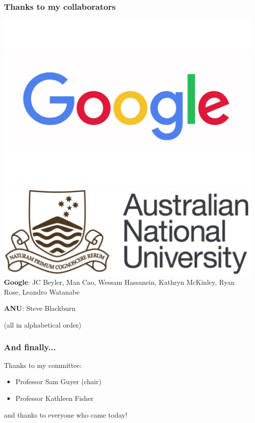 \documentclass[11pt]{beamer}
\begin{document}
\begin{frame}
  \frametitle{Thanks to my collaborators}
  \includegraphics[scale=0.1]{google.jpg}
  \hspace*{\fill}
  \includegraphics[scale=0.1]{anu.jpeg}
  \textbf{Google}: JC Beyler, Man Cao, Wessam Hassanein, Kathryn McKinley, Ryan Rose,
  Leandro Watanabe
  
  \textbf{ANU}: Steve Blackburn

  (all in alphabetical order)
\end{frame}

\begin{frame}
  \frametitle{And finally...}
  Thanks to my committee:
  \begin{itemize}
  \item Professor Sam Guyer (chair)
  \item Professor Kathleen Fisher
  \end{itemize}

  and thanks to everyone who came today!
\end{frame}
\end{document}
